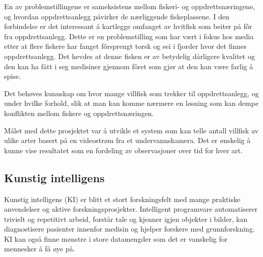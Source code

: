 En av problemstillingene er sameksistens mellom fiskeri- og oppdrettsnæringene, og hvordan oppdrettsanlegg påvirker de nærliggende fiskeplassene. I den forbindelse er det interessant å kartlegge omfanget av hvitfisk som beiter på fôr fra oppdrettsanlegg. Dette er en problemstilling som har vært i fokus hos media etter at flere fiskere har fanget fôrsprengt torsk og sei i fjorder hvor det finnes oppdrettsanlegg. Det hevdes at denne fisken er av betydelig dårligere kvalitet og den kan ha fått i seg medisiner gjennom fôret som gjør at den kan være farlig å spise. \cite{Olsen 2019}

Det behøves kunnskap om hvor mange villfisk som trekker til oppdrettsanlegg, og under hvilke forhold, slik at man kan komme nærmere en løsning som kan dempe konflikten mellom fiskere og oppdrettsnæringen. 

Målet med dette prosjektet var å utvikle et system som kan telle antall villfisk av ulike arter basert på en videostrøm fra et undervannskamera. Det er ønskelig å kunne vise resultatet som en fordeling av observasjoner over tid for hver art.

\subsection{Kunstig intelligens}
\label{part:ai}

Kunstig intelligens (KI) er blitt et stort forskningsfelt med mange praktiske anvendelser og aktive forskningsprosjekter. Intelligent programvare automatiserer trivielt og repetitivt arbeid, forstår tale og kjenner igjen objekter i bilder, kan diagnostisere pasienter innenfor medisin og hjelper forskere med grunnforskning. KI kan også finne mønstre i store datamengder som det er vanskelig for mennesker å få øye på. \cite{Goodfellow m.fl. 2016 s. 1}

